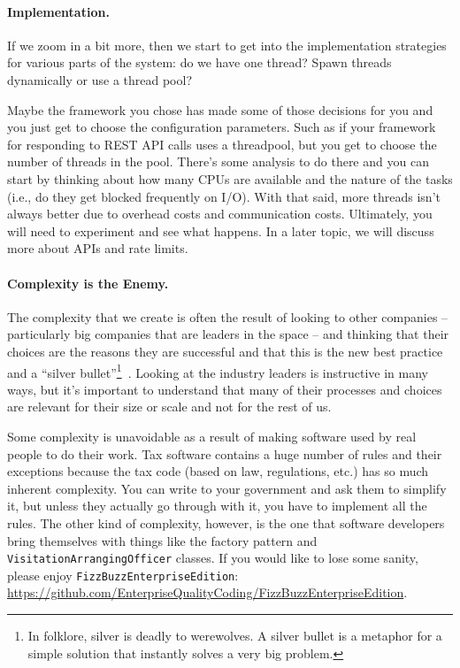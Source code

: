 \paragraph{Implementation.} If we zoom in a bit more, then we start to get into the implementation strategies for various parts of the system: do we have one thread? Spawn threads dynamically or use a thread pool? 

Maybe the framework you chose has made some of those decisions for you and you just get to choose the configuration parameters. Such as if your framework for responding to REST API calls uses a threadpool, but you get to choose the number of threads in the pool. There's some analysis to do there and you can start by thinking about how many CPUs are available and the nature of the tasks (i.e., do they get blocked frequently on I/O). With that said, more threads isn't always better due to overhead costs and communication costs. Ultimately, you will need to experiment and see what happens. In a later topic, we will discuss more about APIs and rate limits.


\paragraph{Complexity is the Enemy.}

The complexity that we create is often the result of looking to other companies -- particularly big companies that are leaders in the space -- and thinking that their choices are the reasons they are successful and that this is the new best practice and a ``silver bullet''\footnote{In folklore, silver is deadly to werewolves. A silver bullet is a metaphor for a simple solution that instantly solves a very big problem.}~\cite{architecture}. Looking at the industry leaders is instructive in many ways, but it's important to understand that many of their processes and choices are relevant for their size or scale and not for the rest of us. 

Some complexity is unavoidable as a result of making software used by real people to do their work. Tax software contains a huge number of rules and their exceptions because the tax code (based on law, regulations, etc.) has so much inherent complexity. You can write to your government and ask them to simplify it, but unless they actually go through with it, you have to implement all the rules. The other kind of complexity, however, is the one that software developers bring themselves with things like the factory pattern and \texttt{VisitationArrangingOfficer} classes. If you would like to lose some sanity, please enjoy \texttt{FizzBuzzEnterpriseEdition}: \url{https://github.com/EnterpriseQualityCoding/FizzBuzzEnterpriseEdition}.
 

